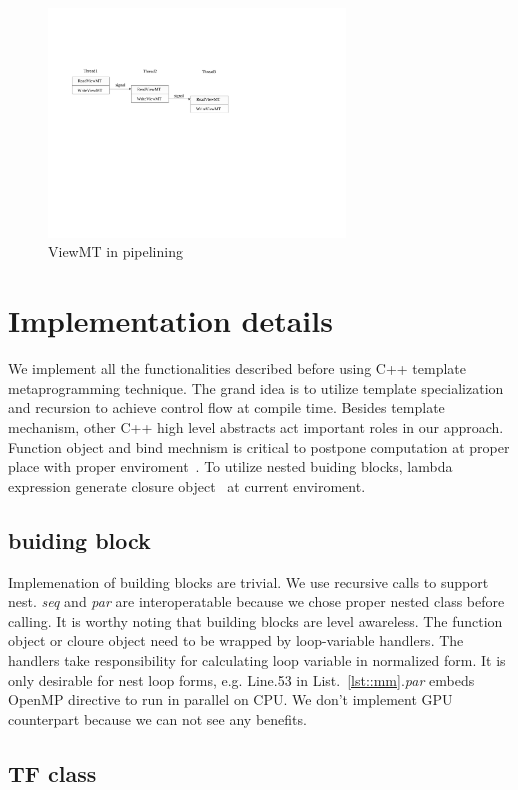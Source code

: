 \begin{figure}[htp]
\includegraphics[width=3.1in]{../viewmt}
\caption{ViewMT in pipelining}\label{fig:viewmt}
\end{figure}

\section{Implementation details}
We implement all the functionalities described before using C++
template metaprogramming technique. The grand idea is to utilize
template specialization and recursion to achieve control flow at
compile time. Besides template mechanism, other  C++ high level
abstracts act important roles in our approach. Function object and bind
mechnism is critical to postpone computation at proper place with
proper enviroment~\cite{modernc++}. To utilize nested buiding blocks,
lambda expression generate closure object~\cite{cpplambda} at current
enviroment. 

\subsection{buiding block}
Implemenation of building blocks are trivial. We use recursive calls
to support nest. \textit{seq} and \textit{par} are interoperatable
because we chose proper nested class before calling.  It is worthy
noting that building blocks are level awareless. The function object
or cloure object need to be wrapped by loop-variable handlers. The
handlers take responsibility for calculating loop variable in
normalized form. It is only desirable for nest loop forms,
e.g. Line.53 in List.~\ref{lst::mm}.\textit{par}
embeds OpenMP directive to run in parallel on CPU. We don't implement
GPU counterpart because we can not see any benefits. 
\subsection{TF class}
